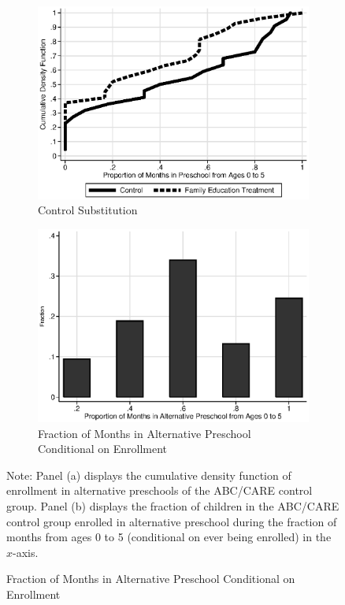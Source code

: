 \begin{figure}[H]
\centering
\caption{Control Substitution Characteristics, ABC/CARE Control Group}\label{fig:control-sub}
\begin{subfigure}[h]{0.7\textwidth}
		\centering
		\caption{Control Substitution} \label{fig:treatsubcare}
		\includegraphics[width=\textwidth]{output/care_controlcontamination_months.eps}
\end{subfigure}

\begin{subfigure}[h]{0.7\textwidth}
	\centering
	\caption{Fraction of Months in Alternative Preschool Conditional on Enrollment} \label{fig:proportion-alt-pre}
		\includegraphics[width=\textwidth]{output/abccare_Vfractimes.eps}
\end{subfigure}
\footnotesize \justify
Note: Panel (a) displays the cumulative density function of enrollment in alternative preschools of the ABC/CARE control group. Panel (b) displays the fraction of children in the ABC/CARE control group enrolled in alternative preschool during the fraction of months from ages 0 to 5 (conditional on ever being enrolled) in the $x$-axis.
\end{figure}

